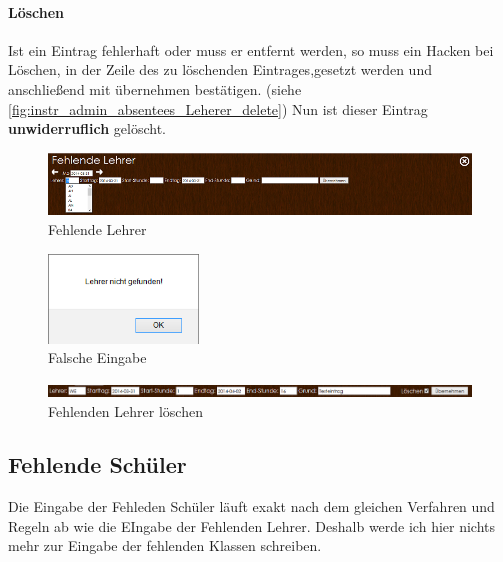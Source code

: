 \paragraph{Löschen}
Ist ein Eintrag fehlerhaft oder muss er entfernt werden, so muss ein Hacken bei Löschen, in der Zeile des zu löschenden Eintrages,gesetzt werden und anschließend mit übernehmen bestätigen. (siehe \autoref{fig:instr_admin_absentees_Leherer_delete}) Nun ist dieser Eintrag \textbf{unwiderruflich} gelöscht.
\begin{figure}[H]
\centering
\includegraphics[keepaspectratio=true, width=16cm]{images/screenshots/fehlende_Lehrer.png}
\caption{Fehlende Lehrer}
\label{fig:instr_admin_absentees_Lehrer}
\end{figure}
\begin{figure}[H]
\centering
\includegraphics[keepaspectratio=true, width=4cm]{images/screenshots/eingabe_fail_lehrer.png}
\caption{Falsche Eingabe}
\label{fig:instr_admin_absentees_fail}
\end{figure}
\begin{figure}[H]
\centering
\includegraphics[keepaspectratio=true, width=16cm]{images/screenshots/fehlende_lehrer_delete.png}
\caption{Fehlenden Lehrer löschen}
\label{fig:instr_admin_absentees_Leherer_delete}
\end{figure}
\subsection{Fehlende Schüler}
Die Eingabe der Fehleden Schüler läuft exakt nach dem gleichen Verfahren und Regeln ab wie die EIngabe der Fehlenden Lehrer. Deshalb werde ich hier nichts mehr zur Eingabe der fehlenden Klassen schreiben.